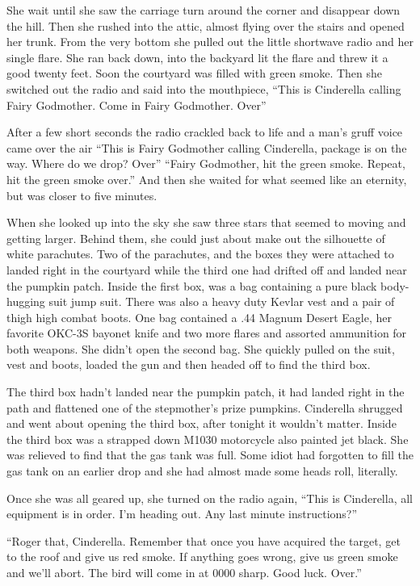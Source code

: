 \documentclass[11pt,letterpaper]{article}
\begin{document}
She wait until she saw the carriage turn around the corner and disappear down the hill. Then she rushed into the attic, almost flying over the stairs and opened her trunk. From the very bottom she pulled out the little shortwave radio and her single flare. She ran back down, into the backyard lit the flare and threw it a good twenty feet. Soon the courtyard was filled with green smoke. Then she switched out the radio and said into the mouthpiece, ``This is Cinderella calling Fairy Godmother. Come in Fairy Godmother. Over''

After a few short seconds the radio crackled back to life and a man's gruff voice came over the air ``This is Fairy Godmother calling Cinderella, package is on the way. Where do we drop? Over'' ``Fairy Godmother, hit the green smoke. Repeat, hit the green smoke over.'' And then she waited for what seemed like an eternity, but was closer to five minutes.

When she looked up into the sky she saw three stars that seemed to moving and getting larger. Behind them, she could just about make out the silhouette of white parachutes. Two of the parachutes, and the boxes they were attached to landed right in the courtyard while the third one had drifted off and landed near the pumpkin patch. Inside the first box, was a bag containing a pure black body-hugging suit jump suit. There was also a heavy duty Kevlar vest and a pair of thigh high combat boots. One bag contained a .44 Magnum Desert Eagle, her favorite OKC-3S bayonet knife and two more flares and assorted ammunition for both weapons. She didn't open the second bag. She quickly pulled on the suit, vest and boots, loaded the gun and then headed off to find the third box.

The third box hadn't landed near the pumpkin patch, it had landed right in the path and flattened one of the stepmother's prize pumpkins. Cinderella shrugged and went about opening the third box, after tonight it wouldn't matter. Inside the third box was a strapped down M1030 motorcycle also painted jet black. She was relieved to find that the gas tank was full. Some idiot had forgotten to fill the gas tank on an earlier drop and she had almost made some heads roll, literally.

Once she was all geared up, she turned on the radio again, ``This is Cinderella, all equipment is in order. I'm heading out. Any last minute instructions?''

``Roger that, Cinderella. Remember that once you have acquired the target, get to the roof and give us red smoke. If anything goes wrong, give us green smoke and we'll abort. The bird will come in at 0000 sharp. Good luck. Over.''
\end{document}
